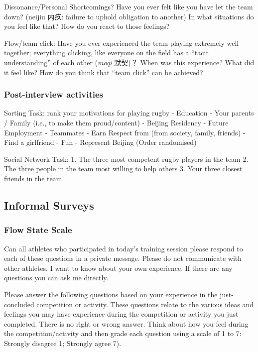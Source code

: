 \begin{CJK}{UTF8}{gbsn}
  Dissonance/Personal Shortcomings?
  Have you ever felt like you have let the team down?  (neijiu 内疚: failure to uphold obligation to another)
  In what situations do you feel like that?
  How do you react to those feelings?

  Flow/team click:
  Have you ever experienced the team playing extremely well together; everything clicking, like everyone on the field has a “tacit understanding” of each other (\textit{moqi} 默契)？
  When was this experience?
  What did it feel like?
  How do you think that “team click” can be achieved?


  \subsubsection{Post-interview activities\label{sect:postInterview}}


  Sorting Task: rank your motivations for playing rugby
  - Education
  - Your parents / Family (i.e., to make them proud/content)
  - Beijing Residency
  - Future Employment
  - Teammates
  - Earn Respect from (from society, family, friends)
  - Find a girlfriend
  - Fun
  - Represent Beijing
  (Order randomised)

  Social Network Task:
  1.	The three most competent rugby players in the team
  2.	The three people in the team most willing to help others
  3.	Your three closest friends in the team



  \subsection{Informal Surveys}



        \subsubsection{Flow State Scale\label{sect:flowStateScale}}

  Can all athletes who participated in today's training session please respond to each of these questions in a private message. Please do not communicate with other athletes, I want to know about your own experience.  If there are any questions you can ask me directly.

  Please answer the following questions based on your experience in the just-concluded competition or activity. These questions relate to the various ideas and feelings you may have experience during the competition or activity you just completed. There is no right or wrong answer. Think about how you feel during the competition/activity and then grade each question using a scale of 1 to 7: Strongly disagree 1; Strongly agree 7).



\end{CJK}
